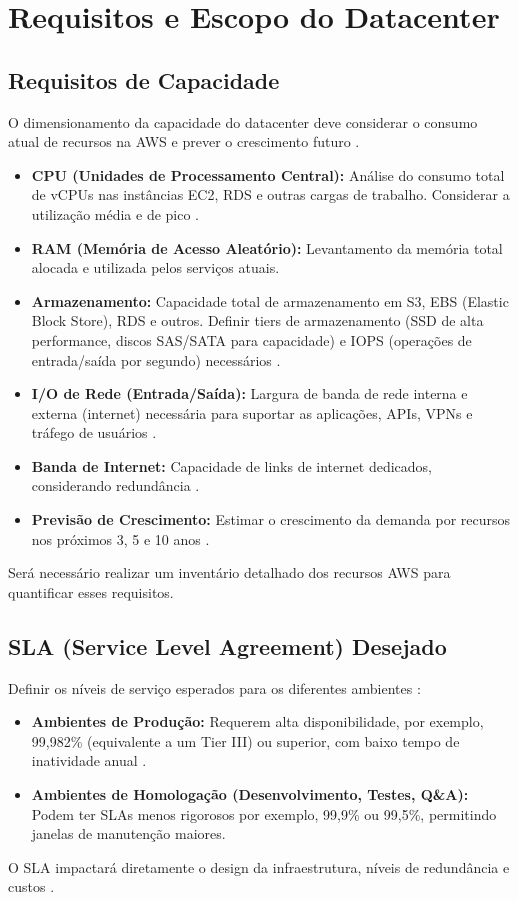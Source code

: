 \documentclass[
	12pt,				%
	oneside,			%
	a4paper,			%
	english,			%
	brazil				%
	]{abntex2unama}
\begin{document}
\chapter{Requisitos e Escopo do Datacenter}
\section{Requisitos de Capacidade}
O dimensionamento da capacidade do datacenter deve considerar o consumo atual de recursos na AWS e prever o crescimento futuro \cite{capacity_planning}.
\begin{itemize}
	\item \textbf{CPU (Unidades de Processamento Central):} Análise do consumo total de vCPUs nas instâncias EC2, RDS e outras cargas de trabalho. Considerar a utilização média e de pico \cite{hyperscale_datacenters}.
	\item \textbf{RAM (Memória de Acesso Aleatório):} Levantamento da memória total alocada e utilizada pelos serviços atuais.
	\item \textbf{Armazenamento:} Capacidade total de armazenamento em S3, EBS (Elastic Block Store), RDS e outros. Definir tiers de armazenamento (SSD de alta performance, discos SAS/SATA para capacidade) e IOPS (operações de entrada/saída por segundo) necessários \cite{dcim_systems}.
	\item \textbf{I/O de Rede (Entrada/Saída):} Largura de banda de rede interna e externa (internet) necessária para suportar as aplicações, APIs, VPNs e tráfego de usuários \cite{network_fabric}.
	\item \textbf{Banda de Internet:} Capacidade de links de internet dedicados, considerando redundância \cite{datacenter_networking}.
	\item \textbf{Previsão de Crescimento:} Estimar o crescimento da demanda por recursos nos próximos 3, 5 e 10 anos \cite{design_principles}.
\end{itemize}
Será necessário realizar um inventário detalhado dos recursos AWS para quantificar esses requisitos.

\section{SLA (Service Level Agreement) Desejado}
Definir os níveis de serviço esperados para os diferentes ambientes \cite{reliability_engineering}:
\begin{itemize}
	\item \textbf{Ambientes de Produção:} Requerem alta disponibilidade, por exemplo, 99,982\% (equivalente a um Tier III) ou superior, com baixo tempo de inatividade anual \cite{datacenter_monitoring}.
	\item \textbf{Ambientes de Homologação (Desenvolvimento, Testes, Q\&A):} Podem ter SLAs menos rigorosos por exemplo, 99,9\% ou 99,5\%, permitindo janelas de manutenção maiores.
\end{itemize}
O SLA impactará diretamente o design da infraestrutura, níveis de redundância e custos \cite{datacenter_automation}.
\end{document}
